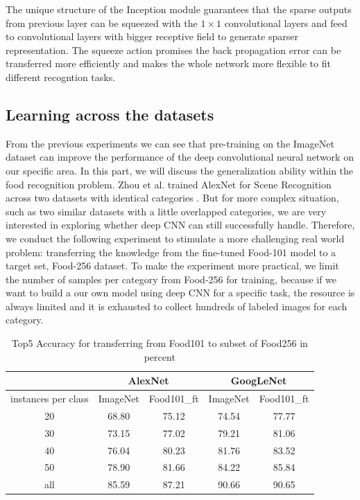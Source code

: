 The unique structure of the Inception module guarantees that the sparse outputs from previous layer can be squeezed with the $1\times 1$ convolutional layers and feed to convolutional layers with bigger receptive field to generate sparser representation. The squeeze action promises the back propagation error can be transferred more efficiently and makes the whole network more flexible to fit different recogntion tasks.

\subsection{Learning across the datasets}
From the previous experiments we can see that pre-training on the ImageNet dataset can improve the performance of the deep convolutional neural network on our specific area. In this part, we will discuss the generalization ability within the food recognition problem.  Zhou et al. trained AlexNet for Scene Recognition across two datasets with identical categories \cite{NIPS2014_Zhou}. But for more complex situation, such as two similar datasets with a little overlapped categories, we are very interested in exploring whether deep CNN can still successfully handle. Therefore, we conduct the following experiment to stimulate a more challenging real world problem: transferring the knowledge from the fine-tuned Food-101 model to a target set, Food-256 dataset. To make the experiment more practical, we limit the number of samples per category from Food-256 for training, because if we want to build a our own model using deep CNN for a specific task, the resource is always limited and it is exhausted to collect hundreds of labeled images for each category.

\begin{table}[htbp]
	\centering
	\begin{tabular}{|c|cc|cc|}
		\hline
		& \multicolumn{2}{c|}{AlexNet} & \multicolumn{2}{c|}{GoogLeNet} \\
		\hline
		instances per class & ImageNet  & Food101\_ft    &  ImageNet  & Food101\_ft \\ \hline
		20    & 68.80  & {75.12} & 74.54 & {77.77} \\
		30    & 73.15 & {77.02} & 79.21 & {81.06} \\
		40    & 76.04 & {80.23} & 81.76 & {83.52} \\
		50    & 78.90  & {81.66} & 84.22 & {85.84} \\
		all    & 85.59 &  {87.21} & {90.66 }&   {90.65}     \\
		\hline
	\end{tabular}%
	\caption{Top5 Accuracy for transferring from Food101 to subset of Food256 in percent}
	\label{tab:cross}%
\end{table}%

